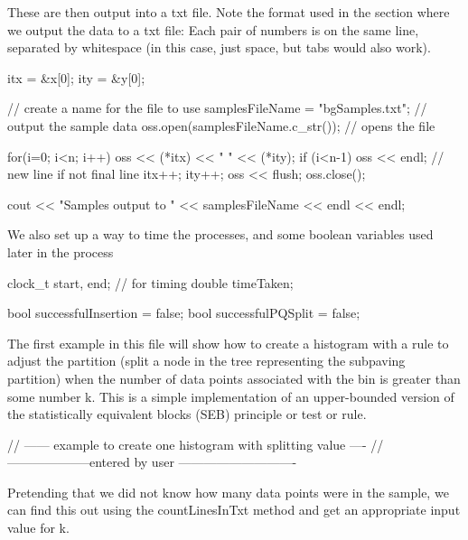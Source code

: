 \-These are then output into a txt file. \-Note the format used in the section where we output the data to a txt file\-: \-Each pair of numbers is on the same line, separated by whitespace (in this case, just space, but tabs would also work).


\begin{DoxyCodeInclude}
    itx = &x[0];
    ity = &y[0];

    // create a name for the file to use
    samplesFileName = "bgSamples.txt";
    // output the sample data
    oss.open(samplesFileName.c_str());         // opens the file

    for(i=0; i<n; i++) {
        oss << (*itx) << "  " << (*ity);
        if (i<n-1) oss << endl; // new line if not final line
        itx++;
        ity++;
    }
    oss << flush;
    oss.close();

    cout << "Samples output to " << samplesFileName << endl << endl;

\end{DoxyCodeInclude}


\-We also set up a way to time the processes, and some boolean variables used later in the process


\begin{DoxyCodeInclude}
    clock_t start, end;     // for timing
    double timeTaken;

    bool successfulInsertion = false;
    bool successfulPQSplit = false;

\end{DoxyCodeInclude}


\-The first example in this file will show how to create a histogram with a rule to adjust the partition (split a node in the tree representing the subpaving partition) when the number of data points associated with the bin is greater than some number k. \-This is a simple implementation of an upper-\/bounded version of the statistically equivalent blocks (\-S\-E\-B) principle or test or rule.


\begin{DoxyCodeInclude}
    // ------ example to create one histogram with splitting value ----
    // --------------------entered by user ----------------------------

\end{DoxyCodeInclude}


\-Pretending that we did not know how many data points were in the sample, we can find this out using the count\-Lines\-In\-Txt method and get an appropriate input value for k.


